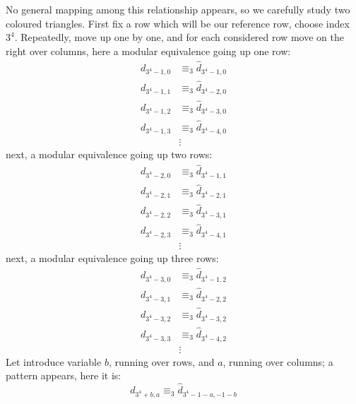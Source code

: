 \documentclass[11pt,a4paper]{article} %
\begin{document}
    No general mapping among this relationship appears, so we
    carefully study two coloured triangles.  First fix a row which
    will be our reference row, choose index $3^4$. Repeatedly, move up
    one by one, and for each considered row move on the right over
    columns, here a modular equivalence going up one row:
    \begin{displaymath}
        \begin{split}
            d_{3^4 -1,0} &\equiv_{3} \hat{d}_{3^4 -1,0} \\
            d_{3^4 -1,1} &\equiv_{3} \hat{d}_{3^4 -2,0} \\
            d_{3^4 -1,2} &\equiv_{3} \hat{d}_{3^4 -3,0} \\
            d_{3^4 -1,3} &\equiv_{3} \hat{d}_{3^4 -4,0} \\
            &\vdots
        \end{split}
    \end{displaymath}
    next, a modular equivalence going up two rows:
    \begin{displaymath}
        \begin{split}
            d_{3^4 -2,0} &\equiv_{3} \hat{d}_{3^4 -1,1} \\
            d_{3^4 -2,1} &\equiv_{3} \hat{d}_{3^4 -2,1} \\
            d_{3^4 -2,2} &\equiv_{3} \hat{d}_{3^4 -3,1} \\
            d_{3^4 -2,3} &\equiv_{3} \hat{d}_{3^4 -4,1} \\
            &\vdots
        \end{split}
    \end{displaymath}
    next, a modular equivalence going up three rows:
    \begin{displaymath}
        \begin{split}
            d_{3^4 -3,0} &\equiv_{3} \hat{d}_{3^4 -1,2} \\
            d_{3^4 -3,1} &\equiv_{3} \hat{d}_{3^4 -2,2} \\
            d_{3^4 -3,2} &\equiv_{3} \hat{d}_{3^4 -3,2} \\
            d_{3^4 -3,3} &\equiv_{3} \hat{d}_{3^4 -4,2} \\
            &\vdots
        \end{split}
    \end{displaymath}
    Let introduce variable $b$, running over rows, and $a$, running
    over columns; a pattern appears, here it is:
    \begin{displaymath}
            d_{3^4 +b,a} \equiv_{3} \hat{d}_{3^4 -1-a,-1-b} 
    \end{displaymath}
\end{document}
